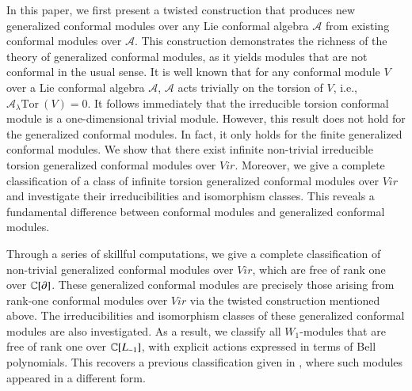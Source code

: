 \documentclass[12pt]{amsart}
\begin{document}
In this paper, we first present a twisted construction that produces new generalized conformal modules over any Lie conformal algebra $\mathcal {A}$ from existing conformal modules over $\mathcal {A}$.  This construction demonstrates the richness of the theory of generalized conformal modules, as it yields modules that are not conformal in the usual sense.
It is well known that for any conformal module $V$ over a Lie conformal algebra $\mathcal {A}$,  $\mathcal {A}$ acts trivially on the torsion of $V$, i.e., $\mathcal{A}_\lambda \text{Tor}~(V)=0$. It follows immediately that the irreducible torsion conformal module is a one-dimensional trivial module.
However, this result does not hold for the generalized conformal modules. In fact, it only holds for the
finite generalized conformal modules.
We show that there exist infinite non-trivial irreducible torsion generalized conformal modules over $Vir$. Moreover, we give a complete classification of a class of infinite torsion generalized conformal modules over $Vir$ and investigate their irreducibilities and isomorphism classes. This reveals a fundamental difference between conformal modules and generalized conformal modules. 

Through a series of skillful computations, we give a complete classification of non-trivial generalized conformal modules over $Vir$, which are free of rank one over $\mathbb{C}[\partial]$. These generalized conformal modules are precisely those arising from rank-one conformal modules over $Vir$ via the twisted construction mentioned above. The irreducibilities and isomorphism classes of these generalized conformal modules are also investigated. As a result,  we classify
 all $W_1$-modules that are free of rank one over $\mathbb{C}[L_{-1}]$, with explicit actions expressed in terms of Bell polynomials. This recovers a previous classification given in \cite{HCL}, where such modules appeared in a different form.
\end{document}

